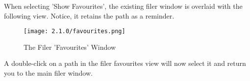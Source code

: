 
   When selecting 'Show Favourites', the existing filer window
   is overlaid with the
   following view. Notice, it retains the path as a reminder.

   \begin{figure}[H]
      \centering
      \texttt{[image: 2.1.0/favourites.png]}
      \caption{The Filer 'Favourites' Window}
      \label{fig:filer_favourites_window}
   \end{figure}

   A double-click on a path in the filer favourites view will now select it and
   return you to the main filer window.

